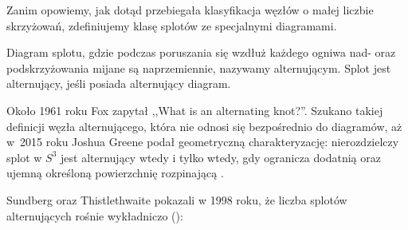 Zanim opowiemy, jak dotąd przebiegała klasyfikacja węzłów o małej liczbie skrzyżowań, zdefiniujemy klasę splotów ze specjalnymi diagramami.

\begin{definition}[alternacja]
    Diagram splotu, gdzie podczas poruszania się wzdłuż każdego ogniwa nad- oraz podskrzyżowania mijane są naprzemiennie, nazywamy alternującym.
    Splot jest alternujący, jeśli posiada alternujący diagram.
\end{definition}

Około 1961 roku Fox zapytał ,,What is an alternating knot?''.
Szukano takiej definicji węzła alternującego, która nie odnosi się bezpośrednio do diagramów, aż w~2015 roku Joshua Greene podał geometryczną charakteryzację: nierozdzielczy splot w $S^3$ jest alternujący wtedy i tylko wtedy, gdy ogranicza dodatnią oraz ujemną określoną powierzchnię rozpinającą \cite{greene17}.

Sundberg oraz Thistlethwaite pokazali w 1998 roku, że liczba splotów alternujących rośnie wykładniczo (\cite{sundberg98}):

